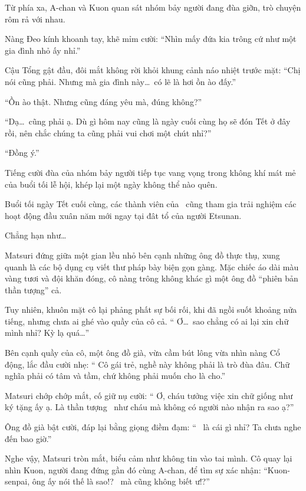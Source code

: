\documentclass[../main.tex]{subfiles}
\begin{document}
Từ phía xa, A-chan và Kuon quan sát nhóm bảy người đang đùa giỡn, trò chuyện rôm rả với nhau.

Nàng Đeo kính khoanh tay, khẽ mỉm cười: ``Nhìn mấy đứa kia trông cứ như một gia đình nhỏ ấy nhỉ.''

Cậu Tổng gật đầu, đôi mắt không rời khỏi khung cảnh náo nhiệt trước mặt: ``Chị nói cũng phải. Nhưng mà gia đình này\dots\ có lẽ là hơi ồn ào đấy.''

``Ồn ào thật. Nhưng cũng đáng yêu mà, đúng không?''

``Dạ\dots\ cũng phải ạ. Dù gì hôm nay cũng là ngày cuối cùng họ sẽ đón Tết ở đây rồi, nên chắc chúng ta cũng phải vui chơi một chút nhỉ?''

``Đồng ý.''

Tiếng cười đùa của nhóm bảy người tiếp tục vang vọng trong không khí mát mẻ của buổi tối lễ hội, khép lại một ngày không thể nào quên.

Buổi tối ngày Tết cuối cùng, các thành viên của \hll\ cũng tham gia trải nghiệm các hoạt động đầu xuân năm mới ngay tại đât tổ của người Etsunan.

Chẳng hạn như\dots

\il

Matsuri đứng giữa một gian lều nhỏ bên cạnh những ông đồ thực thụ, xung quanh là các bộ dụng cụ viết thư pháp bày biện gọn gàng. Mặc chiếc áo dài màu vàng tươi và đội khăn đóng, cô nàng trông không khác gì một ông đồ ``phiên bản thần tượng'' cả.

Tuy nhiên, khuôn mặt cô lại phảng phất sự bối rối, khi đã ngồi suốt khoảng nửa tiếng, nhưng chưa ai ghé vào quầy của cô cả. ``{\color{red} Ơ\dots\ sao chẳng có ai lại xin chữ mình nhỉ? Kỳ lạ quá\dots}''

Bên cạnh quầy của cô, một ông đồ già, vừa cầm bút lông vừa nhìn nàng Cổ động, lắc đầu cười nhẹ: ``{\color{red} Cô gái trẻ, nghề này không phải là trò đùa đâu. Chữ nghĩa phải có tâm và tầm, chứ không phải muốn cho là cho.}''

Matsuri chớp chớp mắt, cố giữ nụ cười: ``{\color{red} Ơ, cháu tưởng việc xin chữ giống như ký tặng ấy ạ. Là thần tượng \hll\ như cháu mà không có người nào nhận ra sao ạ?}''

Ông đồ già bật cười, đáp lại bằng giọng điềm đạm: ``{\color{red} \hll\ là cái gì nhỉ? Ta chưa nghe đến bao giờ.}''

Nghe vậy, Matsuri tròn mắt, biểu cảm như không tin vào tai mình. Cô quay lại nhìn Kuon, người đang đứng gần đó cùng A-chan, để tìm sự xác nhận: ``Kuon-senpai, ông ấy nói thế là sao!? \hll\ mà cũng không biết ư!?''
\end{document}
